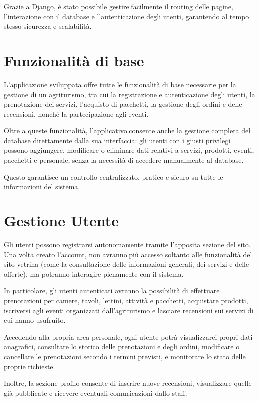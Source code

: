 \documentclass[a4paper,12pt]{report}
\begin{document}
Grazie a Django, è stato possibile gestire facilmente il routing
delle pagine, l'interazione con il database e l'autenticazione degli utenti,
garantendo al tempo stesso sicurezza e scalabilità.

\section{Funzionalità di base}
L'applicazione sviluppata offre tutte le funzionalità di base necessarie per la gestione di un
agriturismo, tra cui la registrazione e autenticazione degli utenti, la prenotazione dei servizi,
l'acquisto di pacchetti, la gestione degli ordini e delle recensioni, nonché la partecipazione agli
eventi.

Oltre a queste funzionalità, l'applicativo consente anche la gestione completa del database
direttamente dalla sua interfaccia: gli utenti con i giusti privilegi possono aggiungere,
modificare o eliminare dati relativi a servizi, prodotti, eventi, pacchetti e personale, senza
la necessità di accedere manualmente al database.

Questo garantisce un controllo centralizzato, pratico e sicuro su tutte le informazioni del sistema.

\section{Gestione Utente}
Gli utenti possono registrarsi autonomamente tramite l'apposita sezione del sito. Una volta creato
l'account, non avranno più accesso soltanto alle funzionalità del sito vetrina (come la consultazione
delle informazioni generali, dei servizi e delle offerte), ma potranno interagire pienamente con il
sistema.

In particolare, gli utenti autenticati avranno la possibilità di effettuare prenotazioni per
camere, tavoli, lettini, attività e pacchetti, acquistare prodotti, iscriversi agli eventi
organizzati dall'agriturismo e lasciare recensioni sui servizi di cui hanno usufruito.

Accedendo alla propria area personale, ogni utente potrà visualizzarei propri dati anagrafici, consultare
lo storico delle prenotazioni e degli ordini, modificare o cancellare le prenotazioni secondo i termini
previsti, e monitorare lo stato delle proprie richieste.

Inoltre, la sezione profilo consente di inserire
nuove recensioni, visualizzare quelle già pubblicate e ricevere eventuali comunicazioni dallo staff.
\end{document}
